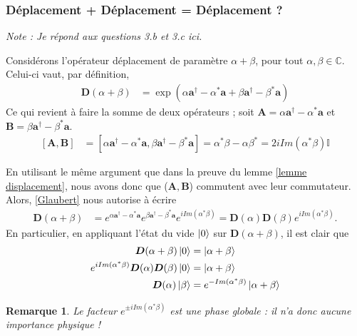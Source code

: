 \documentclass[11pt,oneside,a4paper]{article}
\newtheorem{remark}[theorem]{Remarque}
\begin{document}
\subsubsection{Déplacement + Déplacement = Déplacement ?}
\emph{Note : Je répond aux questions 3.b et 3.c ici.}

Considérons l'opérateur déplacement de paramètre $\alpha+\beta$, pour tout $\alpha,\beta\in\mathbb{C}$. Celui-ci vaut, par définition,
\begin{align}
  \bm{D}(\alpha+\beta) &= \exp(\alpha\bm{a}^\dagger-\alpha^*\bm{a}+\beta\bm{a}^\dagger-\beta^*\bm{a})
\end{align}
Ce qui revient à faire la somme de deux opérateurs ; soit $\bm{A} = \alpha\bm{a}^\dagger-\alpha^*\bm{a}$ et $\bm{B} = \beta\bm{a}^\dagger-\beta^*\bm{a}$.
\begin{align}
  \left[\bm{A},\bm{B}\right] &= \left[\alpha\bm{a}^\dagger-\alpha^*\bm{a},\beta\bm{a}^\dagger-\beta^*\bm{a}\right] = \alpha^*\beta-\alpha\beta^* = 2i Im(\alpha^*\beta)\mathbb{I}
\end{align}

En utilisant le même argument que dans la preuve du lemme \ref{lemme displacement}, nous avons donc que ($\bm{A},\bm{B}$) commutent avec leur commutateur. Alors, \eqref{Glaubert} nous autorise à écrire
\begin{align}
  \bm{D}(\alpha+\beta) &= e^{\alpha\bm{a}^\dagger-\alpha^*\bm{a}}e^{\beta\bm{a}^\dagger-\beta^*\bm{a}}e^{iIm(\alpha^*\beta)} = \bm{D}(\alpha)\bm{D}(\beta)e^{iIm(\alpha^*\beta)}.
\end{align}
En particulier, en appliquant l'état du vide $\ket{0}$ sur $\bm{D}(\alpha+\beta)$, il est clair que
\begin{align}
  \bm{D}(\alpha+\beta)\ket{0} &= \ket{\alpha+\beta}\notag\\
  e^{iIm(\alpha^*\beta)}\bm{D}(\alpha)\bm{D}(\beta)\ket{0} &= \ket{\alpha+\beta}\notag\\
  \bm{D}(\alpha)\ket{\beta} &= e^{-Im(\alpha^*\beta)}\ket{\alpha+\beta}\label{eq:deplacement sur etat coherent}
\end{align}
\begin{remark}
  Le facteur $e^{\pm iIm(\alpha^*\beta)}$ est une phase globale : il n'a donc aucune importance physique ! 
\end{remark}
\end{document}
